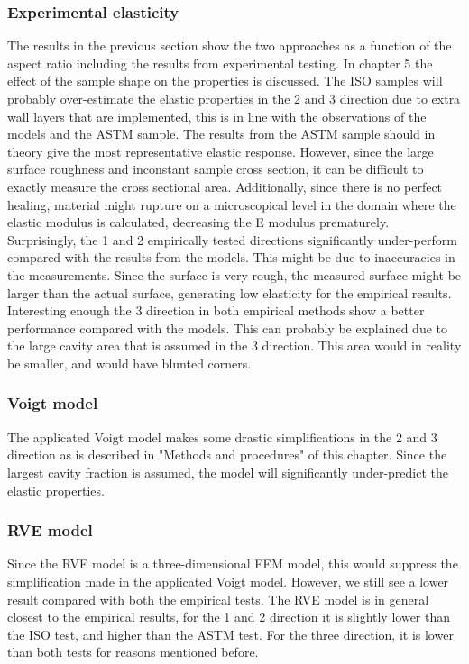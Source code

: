 \subsubsection{Experimental elasticity}
The results in the previous section show the two approaches as a function of the aspect ratio including the results from experimental testing. In chapter 5 the effect of the sample shape on the properties is discussed. The ISO samples will probably over-estimate the elastic properties in the 2 and 3 direction due to extra wall layers that are implemented, this is in line with the observations of the models and the ASTM sample. The results from the ASTM sample should in theory give the most representative elastic response. However, since the large surface roughness and inconstant sample cross section, it can be difficult to exactly measure the cross sectional area. Additionally, since there is no perfect healing, material might rupture on a microscopical level in the domain where the elastic modulus is calculated, decreasing the E modulus prematurely.  Surprisingly, the 1 and 2 empirically tested directions significantly under-perform compared with the results from the models. This might be due to inaccuracies in the measurements. Since the surface is very rough, the measured surface might be larger than the actual surface, generating low elasticity for the empirical results. Interesting enough the 3 direction in both empirical methods show a better performance compared with the models. This can probably be explained due to the large cavity area that is assumed in the 3 direction. This area would in reality be smaller, and would have blunted corners. 
\subsubsection{Voigt model}
The applicated Voigt model makes some drastic simplifications in the 2 and 3 direction as is described in "Methods and procedures" of this chapter. Since the largest cavity fraction is assumed, the model will significantly under-predict the elastic properties. 
\subsubsection{RVE model}
Since the RVE model is a three-dimensional FEM model, this would suppress the simplification made in the applicated Voigt model. However, we still see a lower result compared with both the empirical tests. The RVE model is in general closest to the empirical results, for the 1 and 2 direction it is slightly lower than the ISO test, and higher than the ASTM test. For the three direction, it is lower than both tests for reasons mentioned before.

